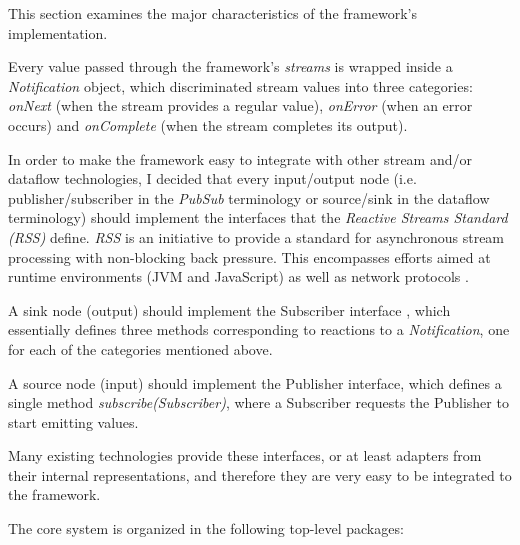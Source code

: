 \documentclass{dithesis}
\begin{document}
This section examines the major characteristics of the framework's implementation.

Every value passed through the framework's \textit{streams} is wrapped inside a \textit{Notification} object, which discriminated stream values into three categories: \textit{onNext} (when the stream provides a regular value), \textit{onError} (when an error occurs) and \textit{onComplete} (when the stream completes its output).

In order to make the framework easy to integrate with other stream and/or dataflow technologies, I decided that every input/output node (i.e. publisher/subscriber in the \textit{PubSub} terminology or source/sink in the dataflow terminology) should implement the interfaces that the \textit{Reactive Streams Standard (RSS)} define. \textit{RSS} is an initiative to provide a standard for asynchronous stream processing with non-blocking back pressure. This encompasses efforts aimed at runtime environments (JVM and JavaScript) as well as network protocols \cite{rss}.

A sink node (output) should implement the Subscriber interface , which essentially defines three methods corresponding to reactions to a \textit{Notification}, one for each of the categories mentioned above. 

A source node (input) should implement the Publisher interface, which defines a single method \textit{subscribe(Subscriber)}, where a Subscriber requests the Publisher to start emitting values. 

Many existing technologies provide these interfaces, or at least adapters from their internal representations, and therefore they are very easy to be integrated to the framework.

The core system is organized in the following top-level packages:
\end{document}
